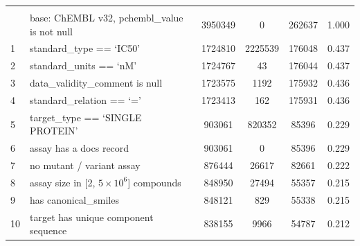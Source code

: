 \begin{table}[htbp]
\begin{tabular}{l l S[table-format=7.0] S[table-format=7.0] S[table-format=6.0] S[table-format=1.3]}
     \\
     & base: ChEMBL v32, pchembl\_value is not null & 3950349 & 0 & 262637 & 1.000 \\
    1 & standard\_type == `IC50' & 1724810 & 2225539 & 176048 & 0.437 \\
    2 & standard\_units == `nM' & 1724767 & 43 & 176044 & 0.437 \\
    3 & data\_validity\_comment is null & 1723575 & 1192 & 175932 & 0.436 \\
    4 & standard\_relation == `=' & 1723413 & 162 & 175931 & 0.436 \\
    5 & target\_type == `SINGLE PROTEIN' & 903061 & 820352 & 85396 & 0.229 \\
    6 & assay has a docs record & 903061 & 0 & 85396 & 0.229 \\
    7 & no mutant / variant assay & 876444 & 26617 & 82661 & 0.222 \\
    8 & assay size in [2, $5\times10^{6}$] compounds & 848950 & 27494 & 55357 & 0.215 \\
    9 & has canonical\_smiles & 848121 & 829 & 55338 & 0.215 \\
    10 & target has unique component sequence & 838155 & 9966 & 54787 & 0.212 \\
    \bottomrule
  \end{tabular}
\end{table}
